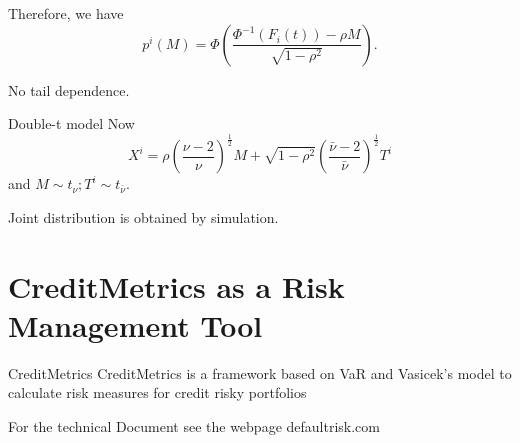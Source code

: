 	Therefore, we have
    $$p^i(M)=\Phi\left(\frac{\Phi^{-1}(F_i(t))-\rho M}{\sqrt{1-\rho^2}}\right).$$
	
	No tail dependence.


Double-t model
	Now
		$$X^i=\rho \left(\frac{\nu-2}{\nu}\right)^\frac{1}{2} M+ \sqrt{1-\rho^2}\left(\frac{\bar{\nu}-2}{\bar{\nu}}\right)^\frac{1}{2}T^i$$
		and 
		$M \sim t_\nu; T^i\sim t_{\bar{\nu}}$.
	
	Joint distribution is obtained by simulation.



\section{CreditMetrics as a Risk Management Tool}

CreditMetrics
	CreditMetrics is a framework based on VaR and Vasicek's model to calculate risk measures for credit risky portfolios  
	
	For the technical Document see the webpage  defaultrisk.com 




 